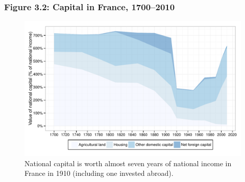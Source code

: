 \documentclass[t]{beamer}\usepackage[]{graphicx}\usepackage[]{color}
\newenvironment{knitrout}{}{} %
\begin{document}
\begin{frame}[label=Figure_3_2]
\frametitle{Figure 3.2: Capital in France, 1700--2010}
\begin{figure}[t]
\begin{minipage}[b]{\textwidth}
\centering
\begin{knitrout}\footnotesize
{}\color{fgcolor}

{\centering \includegraphics[width=1\linewidth]{figures/color/Figure_3_2} 

}



\end{knitrout}
\caption{National capital is worth almost seven years of national income in France in 1910 (including one invested abroad).}
\end{minipage}
\end{figure}
\end{frame}
\end{document}
